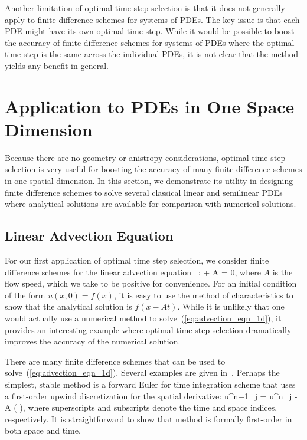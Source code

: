 \documentclass[oneeqnum,onefignum,onetabnum,onethmnum]{siamltex}
\begin{document}
Another limitation of optimal time step selection is that it does not 
generally apply to finite difference schemes for systems of PDEs.  The 
key issue is that each PDE might have its own optimal time step.  While it 
would be possible to boost the accuracy of finite difference schemes for 
systems of PDEs where the optimal time step is the same across the individual 
PDEs, it is not clear that the method yields any benefit in general.


\section{\label{sec:applications_1d} 
         Application to PDEs in One Space Dimension}
Because there are no geometry or anistropy considerations, optimal time step 
selection is very useful for boosting the accuracy of many finite difference 
schemes in one spatial dimension.  In this section, we demonstrate its 
utility in designing finite difference schemes to solve several classical 
linear and semilinear PDEs where analytical solutions are available for 
comparison with numerical solutions.


\subsection{Linear Advection Equation}
For our first application of optimal time step selection, we consider 
finite difference schemes for the linear advection equation
~\cite{leveque_book_1992, leveque_book_2002, gko_book}:
\beq
   + A  = 0,
  \label{eq:advection_eqn_1d}
\eeq
where $A$ is the flow speed, which we take to be positive for convenience.  
For an initial condition of the form $u(x,0) = f(x)$, it is easy to use the 
method of characteristics to show that the analytical solution is $f(x-At)$.  
While it is unlikely that one would actually use a numerical method to 
solve~(\ref{eq:advection_eqn_1d}), it provides an interesting example where 
optimal time step selection dramatically improves the accuracy of the 
numerical solution.

There are many finite difference schemes that can be used to 
solve~(\ref{eq:advection_eqn_1d}).  Several examples are given 
in~\cite{leveque_book_1992}.  Perhaps the simplest, stable method is a 
forward Euler for time integration scheme that uses a first-order upwind 
discretization for the spatial derivative:
\beq
  u^{n+1}_j = u^{n}_j 
  - A \dt \left(  \right),
  \label{eq:advection_eqn_1d_FD_scheme}
\eeq
where superscripts and subscripts denote the time and space indices, 
respectively.  It is straightforward to show that method is formally 
first-order in both space and time.  
\end{document}
